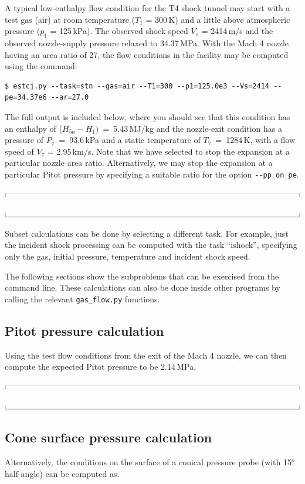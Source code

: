 \documentclass[10pt,a4paper]{article}
\newcommand{\topbar}{\ensuremath{
    \rule{0.1mm}{2.0mm} \rule[2.0mm]{159.5mm}{0.1mm} \rule{0.1mm}{2.0mm}
}}
\newcommand{\bottombar}{\ensuremath{
    \rule{0.1mm}{2.0mm} \rule{159.5mm}{0.1mm} \rule{0.1mm}{2.0mm}
}}
\begin{document}
\medskip
A typical low-enthalpy flow condition for the T4 shock tunnel may start with
a test gas (air) at room temperature ($T_1$ = 300\,K) 
and a little above atmospheric pressure ($p_1$ = 125\,kPa).
The observed shock speed $V_s$ = 2414\,m/s and the observed nozzle-supply pressure
relaxed to 34.37\,MPa.
With the Mach 4 nozzle having an area ratio of 27, the flow conditions in the facility
may be computed using the command:
\begin{verbatim}
$ estcj.py --task=stn --gas=air --T1=300 --p1=125.0e3 --Vs=2414 --pe=34.37e6 --ar=27.0
\end{verbatim}
The full output is included below, where you should see that
this condition has an enthalpy of ($H_{5a} - H_1)$~=~5.43\,MJ/kg and the nozzle-exit condition
has a pressure of $P_7$~=~93.6\,kPa and a static temperature of $T_7$~=~1284\,K,
with a flow speed of $V_7$ = 2.95\,km/s.
Note that we have selected to stop the expansion at a particular nozzle area ratio.
Alternatively, we may stop the expansion at a particular Pitot pressure by specifying
a suitable ratio for the option \verb?--pp_on_pe?.

\medskip
\noindent\topbar

\bottombar

\medskip
Subset calculations can be done by selecting a different task.
For example, just the incident shock processing can be computed with the task ``ishock'',
specifying only the gas, initial pressure, temperature and incident shock speed.

\medskip
The following sections show the subproblems that can be exercised from the command line.
These calculations can also be done inside other programs by calling 
the relevant \verb?gas_flow.py? functions.

\bigskip
\subsection{Pitot pressure calculation}
%
Using the test flow conditions from the exit of the Mach 4 nozzle, we can then
compute the expected Pitot pressure to be 2.14\,MPa.

\medskip
\noindent\topbar

\bottombar

\bigskip
\subsection{Cone surface pressure calculation}
%
Alternatively, the conditions on the surface of a conical pressure probe
(with 15$^o$ half-angle) can be computed as.
\end{document}
